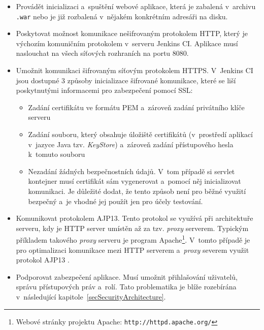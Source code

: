             \begin{itemize}
                \item Provádět inicializaci a~spuštění webové aplikace, která je zabalená v~archivu \texttt{.war}
                    nebo je již rozbalená v~nějakém konkrétním adresáři na disku.
                
                \item Poskytovat možnost komunikace nešifrovaným protokolem HTTP, který je výchozím
                    komuničním protokolem v~serveru Jenkins CI.  Aplikace musí naslouchat na všech síťových rozhraních na portu 8080.
                
                \item Umožnit komunikaci šifrovaným síťovým protokolem HTTPS. V~Jenkins CI jsou dostupné 
                    3 způsoby inicializace šifrované komunikace, které se liší poskytnutými informacemi pro 
                    zabezpečení pomocí SSL:
                    \begin{itemize}
                        \item Zadání certifikátu ve formátu PEM a~zároveň zadání privátního klíče serveru
                        \item Zadání souboru, který obsahuje úložiště certifikátů (v~prostředí aplikací v~jazyce Java tzv. \emph{KeyStore}) a~zároveň zadání 
                            přístupového hesla k~tomuto souboru
                        \item Nezadání žádných bezpečnostních údajů. V~tom případě si servlet kontejner musí certifikát sám
                            vygenerovat a~pomocí něj inicializovat komunikaci. Je důležité dodat, že tento způsob
                            není pro běžné využití bezpečný a~je vhodné jej použít jen pro účely testování.
                    \end{itemize} 

                \item Komunikovat protokolem AJP13. Tento protokol se využívá při architektuře serveru,
                    kdy je HTTP server umístěn až za tzv. \emph{proxy} serverem. Typickým příkladem takového
                    \emph{proxy} serveru je program Apache\footnote{Webové stránky projektu Apache: 
                    \texttt{http://httpd.apache.org/}}. V~tomto případě je pro optimalizaci komunikace mezi HTTP serverem
                    a~\emph{proxy} severem využit protokol AJP13 \cite{ajp13Web}.

                \item Podporovat zabezpečení aplikace. Musí umožnit přihlašování uživatelů, správu přístupových práv a~rolí.
                    Tato problematika je blíže rozebírána v~následující kapitole~\ref{secSecurityArchitecture}.
                    

\end{itemize}
